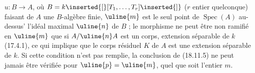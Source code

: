 $u:B\longrightarrow A$, où $B=k\inserted{[}[T_1,\ldots,T_r]\inserted{]}$ ($r$ entier quelconque) faisant de $A$ une $B$-algèbre finie, $\uline{m}$ est le seul point de $\operatorname{Spec}(A)$ au-dessus'  l'idéal maximal  $\uline{n}$ de $B$ ;  le morphisme  ne peut être non ramifié en $\uline{m}$ que si $A/\uline{n}A$ est un corps, extension séparable de $k$ (17.4.1), ce qui implique que le corps résiduel $K$ de $A$ est une extension séparable de $k$. Si cette condition n'est pas remplie, la conclusion de (18.11.5) ne peut jamais être vérifiée pour $\uline{p}=\uline{m}$, quel que soit l'entier $m$.

